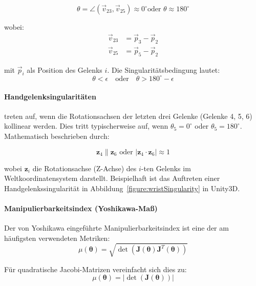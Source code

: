 \begin{equation}
  \theta = \angle(\vec{v}_{23}, \vec{v}_{25}) \approx 0^\circ \text{
  oder } \theta \approx 180^\circ
  \label{eq:elbow_singularity}
\end{equation}

wobei:
\begin{align}
  \vec{v}_{23} & = \vec{p}_3 - \vec{p}_2 \\
  \vec{v}_{25} & = \vec{p}_5 - \vec{p}_2
\end{align}

mit $\vec{p}_i$ als Position des Gelenks $i$. Die Singularitätsbedingung lautet:
\begin{equation}
  \theta < \epsilon \quad \text{oder} \quad \theta > 180^\circ - \epsilon
\end{equation}

\paragraph{Handgelenksingularitäten} treten auf, wenn die Rotationsachsen der
letzten drei Gelenke (Gelenke 4, 5, 6) kollinear werden. Dies tritt
typischerweise auf, wenn $\theta_5 = 0^\circ$ oder $\theta_5 =
180^\circ$. Mathematisch
beschrieben durch:

\begin{equation}
  \mathbf{z}_4 \parallel \mathbf{z}_6 \text{ oder } |\mathbf{z}_4
  \cdot \mathbf{z}_6| \approx 1
  \label{eq:wrist_singularity}
\end{equation}
 
wobei $\mathbf{z}_i$ die Rotationsachse (Z-Achse) des $i$-ten Gelenks im
Weltkoordinatensystem darstellt. Beispielhaft ist das Auftreten einer
Handgelenkssingularität in Abbildung~\ref{figure:wristSingularity}
in Unity3D.

\paragraph{Manipulierbarkeitsindex (Yoshikawa-Maß)} Der von Yoshikawa
\cite{yoshikawa1985manipulability} eingeführte Manipulierbarkeitsindex ist eine
der am häufigsten verwendeten Metriken:
\begin{equation}
  \mu(\boldsymbol{\theta}) =
  \sqrt{\det(\mathbf{J}(\boldsymbol{\theta})\mathbf{J}^T(\boldsymbol{\theta}))}
  \label{eq:yoshikawa_measure}
\end{equation}

Für quadratische Jacobi-Matrizen vereinfacht sich dies zu:
\begin{equation}
  \mu(\boldsymbol{\theta}) = |\det(\mathbf{J}(\boldsymbol{\theta}))|
  \label{eq:yoshikawa_simplified}
\end{equation}
 
